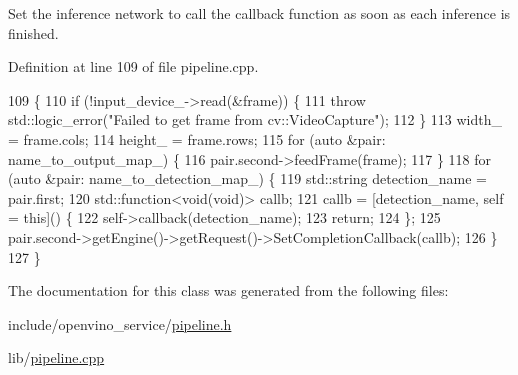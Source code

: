 Set the inference network to call the callback function as soon as each inference is finished. 



Definition at line 109 of file pipeline.\+cpp.


\begin{DoxyCode}
109                            \{
110   \textcolor{keywordflow}{if} (!input\_device\_->read(&frame)) \{
111     \textcolor{keywordflow}{throw} std::logic\_error(\textcolor{stringliteral}{"Failed to get frame from cv::VideoCapture"});
112   \}
113   width\_ = frame.cols;
114   height\_ = frame.rows;
115   \textcolor{keywordflow}{for} (\textcolor{keyword}{auto} &pair: name\_to\_output\_map\_) \{
116     pair.second->feedFrame(frame);
117   \}
118   \textcolor{keywordflow}{for} (\textcolor{keyword}{auto} &pair: name\_to\_detection\_map\_) \{
119     std::string detection\_name = pair.first;
120     std::function<void(void)> callb;
121     callb = [detection\_name, \textcolor{keyword}{self} = \textcolor{keyword}{this}]() \{
122       \textcolor{keyword}{self}->callback(detection\_name);
123       \textcolor{keywordflow}{return};
124     \};
125     pair.second->getEngine()->getRequest()->SetCompletionCallback(callb);
126   \}
127 \}
\end{DoxyCode}


The documentation for this class was generated from the following files\+:\begin{DoxyCompactItemize}
\item 
include/openvino\+\_\+service/\hyperlink{pipeline_8h}{pipeline.\+h}\item 
lib/\hyperlink{pipeline_8cpp}{pipeline.\+cpp}\end{DoxyCompactItemize}
